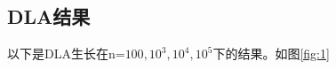 \documentclass{article}
\begin{document}
\subsection{DLA结果}
以下是DLA生长在n=$ 100,10^3,10^4,10^5 $下的结果。如图\ref{fig:1}
 \begin{figure}[!h]
	\centering
	

\end{figure}
\end{document}
